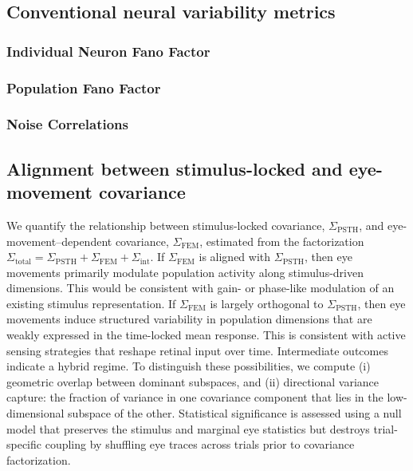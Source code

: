 \documentclass{lite}
\newcommand{\Cfem}{\Sigma_{\text{FEM}}}
\begin{document}

\subsection{Conventional neural variability metrics}
\subsubsection{Individual Neuron Fano Factor}
\subsubsection{Population Fano Factor}
\subsubsection{Noise Correlations}

\subsection{Alignment between stimulus-locked and eye-movement covariance}
We quantify the relationship between stimulus-locked covariance, $\Sigma_{\mathrm{PSTH}}$, and
eye-movement--dependent covariance, $\Sigma_{\mathrm{FEM}}$, estimated from the factorization
$\Sigma_{\mathrm{total}}=\Sigma_{\mathrm{PSTH}}+\Sigma_{\mathrm{FEM}}+\Sigma_{\mathrm{int}}$.
If $\Sigma_{\mathrm{FEM}}$ is aligned with $\Sigma_{\mathrm{PSTH}}$, then eye movements primarily
modulate population activity along stimulus-driven dimensions. This would be consistent with gain- or phase-like modulation of an existing stimulus representation. If $\Sigma_{\mathrm{FEM}}$ is largely orthogonal
to $\Sigma_{\mathrm{PSTH}}$, then eye movements induce structured variability in population
dimensions that are weakly expressed in the time-locked mean response. This is consistent with active
sensing strategies that reshape retinal input over time. Intermediate outcomes indicate a hybrid
regime. To distinguish these possibilities, we compute (i) geometric overlap between dominant
subspaces, and (ii) directional variance capture: the fraction of variance in one covariance component
that lies in the low-dimensional subspace of the other. Statistical significance is assessed using a null
model that preserves the stimulus and marginal eye statistics but destroys trial-specific coupling by
shuffling eye traces across trials prior to covariance factorization.
\end{document}
